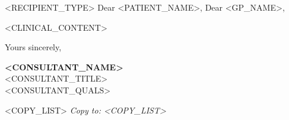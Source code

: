 \documentclass[a4paper,11pt]{letter}
\newcommand{\patientname}{<PATIENT_NAME>}
\newcommand{\gpname}{<GP_NAME>}
\newcommand{\clinicalcontent}{<CLINICAL_CONTENT>}
\newcommand{\consultantname}{<CONSULTANT_NAME>}
\newcommand{\consultanttitle}{<CONSULTANT_TITLE>}
\newcommand{\consultantqualifications}{<CONSULTANT_QUALS>}
\newcommand{\recipienttype}{<RECIPIENT_TYPE>} %
\newcommand{\copylist}{<COPY_LIST>}
\begin{document}
\vspace{10mm}

\noindent
\ifx\recipienttype\patienttype
    Dear \patientname,
\else
    Dear \gpname,
\fi

\vspace{5mm}

\noindent
\clinicalcontent

\vspace{10mm}

\noindent
Yours sincerely,

\vspace{15mm}

\noindent
\textbf{\consultantname}\\
\consultanttitle\\
\consultantqualifications

\vspace{10mm}

\ifx\copylist\empty
\else
    \noindent
    \textit{Copy to: \copylist}
\fi
\end{document}
